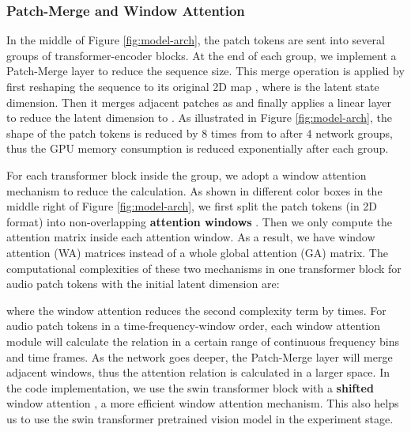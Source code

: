 \documentclass{article}
\begin{document}
\vspace{-0.3cm}
\subsubsection{Patch-Merge and Window Attention}
In the middle of Figure \ref{fig:model-arch}, the patch tokens are sent into several groups of transformer-encoder blocks. At the end of each group, we implement a Patch-Merge layer \cite{swintransformer} to reduce the sequence size. This merge operation is applied by first reshaping the sequence to its original 2D map , where  is the latent state dimension. Then it merges adjacent patches as  and finally applies a linear layer to reduce the latent dimension to . As illustrated in Figure \ref{fig:model-arch}, the shape of the patch tokens is reduced by 8 times from  to  after 4 network groups, thus the GPU memory consumption is reduced exponentially after each group. 

For each transformer block inside the group, 
we adopt a window attention mechanism to reduce the calculation. As shown in different color boxes in the middle right of Figure \ref{fig:model-arch}, we first split the patch tokens (in 2D format) into non-overlapping  \textbf{attention windows} . Then we only compute the attention matrix inside each  attention window. As a result, we have  window attention (WA) matrices instead of a whole global attention (GA) matrix. The computational complexities of these two mechanisms in one transformer block for  audio patch tokens with the initial latent dimension  are:

where the window attention reduces the second complexity term by  times. For audio patch tokens in a time-frequency-window order, each window attention module will calculate the relation in a certain range of continuous frequency bins and time frames. As the network goes deeper, the Patch-Merge layer will merge adjacent windows, thus the attention relation is calculated in a larger space. In the code implementation, we use the swin transformer block with a \textbf{shifted} window attention \cite{swintransformer}, a more efficient window attention mechanism. This also helps us to use the swin transformer pretrained vision model in the experiment stage.



\vspace{-0.2cm}
\end{document}
